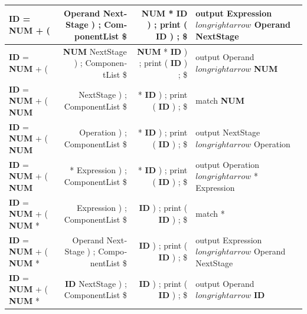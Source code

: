 \documentclass{article}
\begin{document}
\begin{latin}
\begin{table}[H]
{\begin{tabular}{|l|r|r|l|}
\textbf{ID} = \textbf{NUM} + (                                                        & Operand NextStage ) ; ComponentList \$      & \textbf{NUM} * \textbf{ID} ) ; print ( \textbf{ID} ) ; \$                                & output Expression $longrightarrow$ Operand NextStage            \\ \hline
\textbf{ID} = \textbf{NUM} + (                                                        & \textbf{NUM} NextStage ) ; ComponentList \$ & \textbf{NUM} * \textbf{ID} ) ; print ( \textbf{ID} ) ; \$                                & output Operand $longrightarrow$ \textbf{NUM}                    \\ \hline
\textbf{ID} = \textbf{NUM} + ( \textbf{NUM}                                           & NextStage ) ; ComponentList \$              & * \textbf{ID} ) ; print ( \textbf{ID} ) ; \$                                             & match \textbf{NUM}                                              \\ \hline
\textbf{ID} = \textbf{NUM} + ( \textbf{NUM}                                           & Operation ) ; ComponentList \$              & * \textbf{ID} ) ; print ( \textbf{ID} ) ; \$                                             & output NextStage $longrightarrow$ Operation                     \\ \hline
\textbf{ID} = \textbf{NUM} + ( \textbf{NUM}                                           & * Expression ) ; ComponentList \$           & * \textbf{ID} ) ; print ( \textbf{ID} ) ; \$                                             & output Operation $longrightarrow$ * Expression                  \\ \hline
\textbf{ID} = \textbf{NUM} + ( \textbf{NUM} *                                         & Expression ) ; ComponentList \$             & \textbf{ID} ) ; print ( \textbf{ID} ) ; \$                                               & match *                                                         \\ \hline
\textbf{ID} = \textbf{NUM} + ( \textbf{NUM} *                                         & Operand NextStage ) ; ComponentList \$      & \textbf{ID} ) ; print ( \textbf{ID} ) ; \$                                               & output Expression $longrightarrow$ Operand NextStage            \\ \hline
\textbf{ID} = \textbf{NUM} + ( \textbf{NUM} *                                         & \textbf{ID} NextStage ) ; ComponentList \$  & \textbf{ID} ) ; print ( \textbf{ID} ) ; \$                                               & output Operand $longrightarrow$ \textbf{ID}                     \\ \hline

\end{tabular}}
\end{table}
\end{latin}
\end{document}

